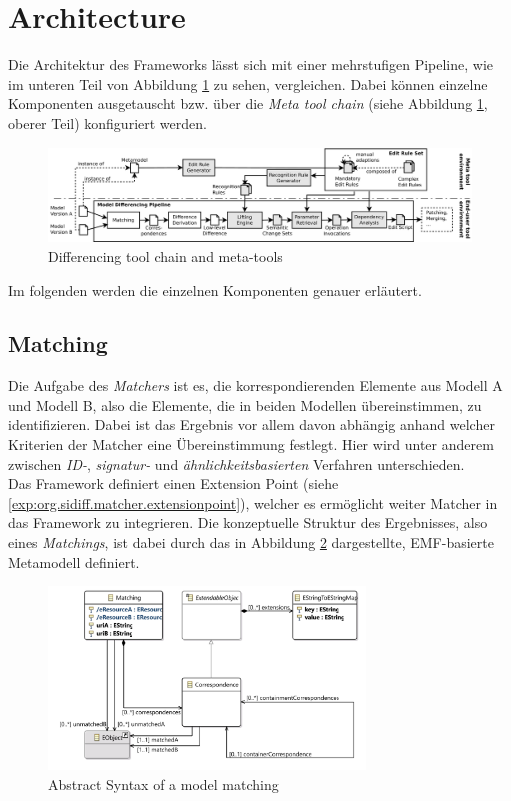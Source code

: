 \section{Architecture}
Die Architektur des Frameworks lässt sich mit einer mehrstufigen Pipeline, wie im unteren Teil von Abbildung \ref{fig:pipeline} zu sehen, vergleichen. Dabei können einzelne Komponenten ausgetauscht bzw. über die \textit{Meta tool chain} (siehe Abbildung \ref{fig:pipeline}, oberer Teil) konfiguriert werden.

\begin{figure}[h!]
\centering
\includegraphics[width=\textwidth]{images/architecture/pipeline}
\caption{Differencing tool chain and meta-tools}
\label{fig:pipeline}
\end{figure}

Im folgenden werden die einzelnen Komponenten genauer erläutert.

\subsection{Matching}

Die Aufgabe des \textit{Matchers} ist es, die korrespondierenden Elemente aus Modell A und Modell B, also die Elemente, die in beiden Modellen übereinstimmen, zu identifizieren.
Dabei ist das Ergebnis vor allem davon abhängig anhand welcher Kriterien der Matcher eine Übereinstimmung festlegt.
Hier wird unter anderem zwischen \textit{ID-}, \textit{signatur-} und \textit{ähnlichkeitsbasierten} Verfahren unterschieden.\\
Das Framework definiert einen Extension Point (siehe \ref{exp:org.sidiff.matcher.extensionpoint}), welcher es ermöglicht weiter Matcher in das Framework zu integrieren.
Die konzeptuelle Struktur des Ergebnisses, also eines \textit{Matchings}, ist dabei durch das in Abbildung \ref{fig:matching_model} dargestellte, EMF-basierte Metamodell definiert.

\begin{figure}[h!]
\centering
\includegraphics[width=0.75\textwidth]{images/architecture/matching_model}
\caption{Abstract Syntax of a model matching}
\label{fig:matching_model}
\end{figure}

